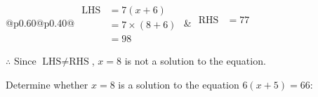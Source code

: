 \documentclass[12pt]{article}
\newcounter{minipagecount}
\begin{document}
\begin{multicols}{2}
\begin{minipage}[t]{0.40\textwidth}
    \renewcommand{\arraystretch}{1.3} %
    \begin{tabular}{@{}p{0.60\linewidth}@{}p{0.40\linewidth}@{}}
        \(\begin{aligned}
            \text{LHS} &= 7(x + 6) \\
                    &= 7 \times(8 + 6) \\
                    &= 98
        \end{aligned}\) &
        \(\begin{aligned}
            \text{RHS} &= 77\\
                    & \\
                    &
        \end{aligned}\)
    \end{tabular}
    \renewcommand{\arraystretch}{1.0} %
    \vspace{2pt}  %

    \noindent \(\therefore\) Since \(\text{LHS} \neq \text{RHS}\), \(x = 8\) is not  a solution to the equation.

\end{minipage}

 \vspace*{16pt}
\noindent{(\theminipagecount)}\hspace{0.1mm} %
\begin{minipage}[t]{0.40\textwidth} %

    \noindent Determine whether \(x = 8\) is a solution to the equation \(6(x + 5) = 66\):
    \vspace{4pt}  %

    \noindent


\end{minipage}
\end{multicols}
\end{document}
